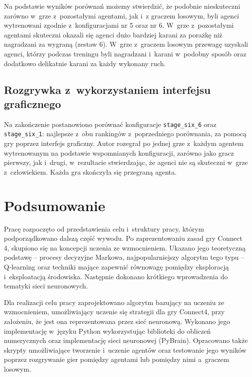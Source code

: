 \documentclass[a4paper, 12pt, oneside]{report}
\begin{document}
\needspace{5em}



\needspace{5em}



Na podstawie wyników porównań możemy stwierdzić, że podobnie nieskuteczni zarówno w~grze z~pozostałymi agentami, jak i~z graczem losowym, byli agenci wytrenowani zgodnie z~konfiguracjami nr 5 oraz nr 6. W~grze z~pozostałymi agentami skuteczni okazali się agenci dużo bardziej karani za porażkę niż nagradzani za wygraną (zestaw 6). W~grze z~graczem losowym przewagę uzyskali agenci, którzy podczas treningu byli nagradzani i~karani w~podobny sposób oraz dodatkowo delikatnie karani za każdy wykonany ruch.

\section{Rozgrywka z~wykorzystaniem interfejsu graficznego}

\begin{sloppypar}
Na zakończenie postanowiono porównać konfiguracje \texttt{stage\_six\_6} oraz \texttt{stage\_six\_1}: najlepsze z~obu rankingów z~poprzedniego porównania, za pomocą gry poprzez interfejs graficzny. Autor rozegrał po jednej grze z~każdym agentem wytrenowanym na podstawie wspomnianych konfiguracji, zarówno jako gracz pierwszy, jak i~drugi, w~rezultacie stwierdzając, że agenci nie są skuteczni w~grze z~człowiekiem. Każda gra skończyła się przegraną agenta.
\end{sloppypar}

\chapter{Podsumowanie}
Pracę rozpoczęto od przedstawienia celu i~struktury pracy, którym podporządkowano dalszą część wywodu. Po zaprezentowaniu zasad gry Connect 4, skupiono się na koncepcji uczenia ze wzmocnieniem. Ukazano jego teoretyczną podstawę -- procesy decyzyjne Markowa, najpopularniejszy algorytm tego typu -- Q-learning oraz techniki mające zapewnić równowagę pomiędzy eksploracją i~eksploatacją środowiska. Następnie dokonano krótkiego wprowadzenia do tematyki sieci neuronowych.

Dla realizacji celu pracy zaprojektowano algorytm bazujący na uczeniu ze wzmocnieniem, umożliwiający uczenie się strategii dla gry Connect4, przy założeniu, że jest ona reprezentowana przez sieć neuronową. Wykonano jego implementację w~języku Python wykorzystując biblioteki do obliczeń numerycznych oraz implementację sieci neuronowej (PyBrain). Opracowano także skrypty umożliwiające tworzenie i~uczenie agentów oraz testowanie jego wyników poprzez rozgrywanie gier pomiędzy agentami lub pomiędzy nimi a~graczem losowym.
\end{document}
